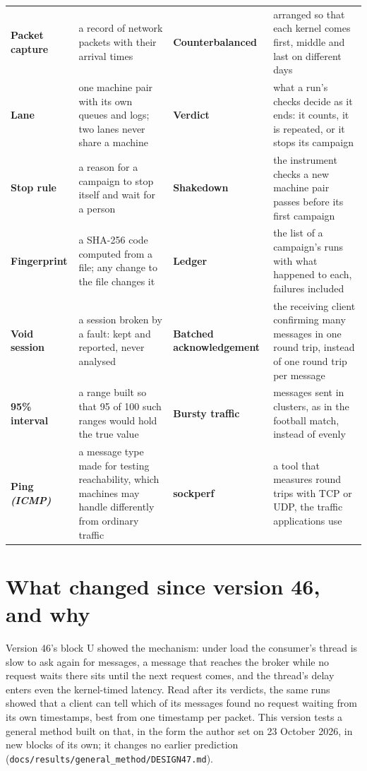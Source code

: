 \documentclass[11pt]{article}
\newcommand{\gl}[1]{{\color{soft}\itshape\small (#1)}}
\begin{document}
{\begin{tabularx}{\linewidth}{@{}>{\bfseries}p{3.1cm} X >{\bfseries}p{3.1cm} X@{}}
Packet capture & a record of network packets with their arrival times & Counterbalanced & arranged so that each kernel comes first, middle and last on different days \\
Lane & one machine pair with its own queues and logs; two lanes never share a machine & Verdict & what a run's checks decide as it ends: it counts, it is repeated, or it stops its campaign \\
Stop rule & a reason for a campaign to stop itself and wait for a person & Shakedown & the instrument checks a new machine pair passes before its first campaign \\
Fingerprint & a SHA-256 code computed from a file; any change to the file changes it & Ledger & the list of a campaign's runs with what happened to each, failures included \\
Void session & a session broken by a fault: kept and reported, never analysed & Batched acknowledgement & the receiving client confirming many messages in one round trip, instead of one round trip per message \\
95\% interval & a range built so that 95 of 100 such ranges would hold the true value & Bursty traffic & messages sent in clusters, as in the football match, instead of evenly \\
Ping \gl{ICMP} & a message type made for testing reachability, which machines may handle differently from ordinary traffic & sockperf & a tool that measures round trips with TCP or UDP, the traffic applications use \\
\end{tabularx}}

\section*{What changed since version 46, and why}
Version 46's block U showed the mechanism: under load the consumer's thread is slow to ask again
for messages, a message that reaches the broker while no request waits there sits until the next
request comes, and the thread's delay enters even the kernel-timed latency. Read after its
verdicts, the same runs showed that a client can tell which of its messages found no request
waiting from its own timestamps, best from one timestamp per packet. This version tests a general
method built on that, in the form the author set on 23 October 2026, in new blocks of its own; it
changes no earlier prediction (\texttt{docs/results/general\_method/DESIGN47.md}).
\end{document}

